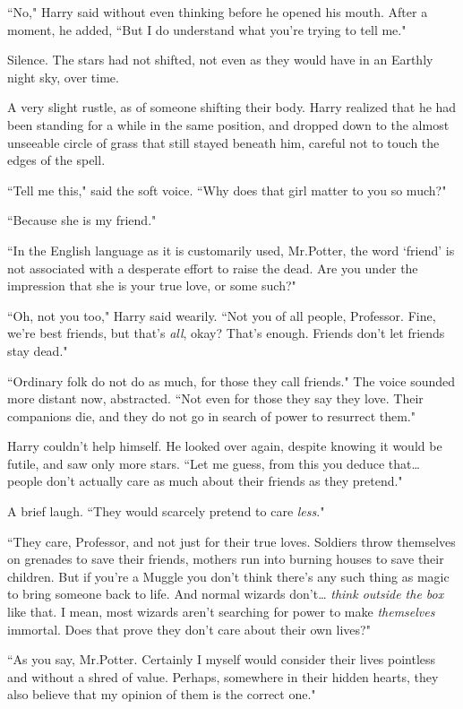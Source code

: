 ``No," Harry said without even thinking before he opened his mouth. After a moment, he added, ``But I do understand what you're trying to tell me."

Silence. The stars had not shifted, not even as they would have in an Earthly night sky, over time.

A very slight rustle, as of someone shifting their body. Harry realized that he had been standing for a while in the same position, and dropped down to the almost unseeable circle of grass that still stayed beneath him, careful not to touch the edges of the spell.

``Tell me this," said the soft voice. ``Why does that girl matter to you so much?"

``Because she is my friend."

``In the English language as it is customarily used, Mr.\?Potter, the word `friend' is not associated with a desperate effort to raise the dead. Are you under the impression that she is your true love, or some such?"

``Oh, not you too," Harry said wearily. ``Not you of all people, Professor. Fine, we're best friends, but that's \emph{all}, okay? That's enough. Friends don't let friends stay dead."

``Ordinary folk do not do as much, for those they call friends." The voice sounded more distant now, abstracted. ``Not even for those they say they love. Their companions die, and they do not go in search of power to resurrect them."

Harry couldn't help himself. He looked over again, despite knowing it would be futile, and saw only more stars. ``Let me guess, from this you deduce that{\ldots} people don't actually care as much about their friends as they pretend."

A brief laugh. ``They would scarcely pretend to care \emph{less}."

``They care, Professor, and not just for their true loves. Soldiers throw themselves on grenades to save their friends, mothers run into burning houses to save their children. But if you're a Muggle you don't think there's any such thing as magic to bring someone back to life. And normal wizards don't{\ldots} \emph{think outside the box} like that. I mean, most wizards aren't searching for power to make \emph{themselves} immortal. Does that prove they don't care about their own lives?"

``As you say, Mr.\?Potter. Certainly I myself would consider their lives pointless and without a shred of value. Perhaps, somewhere in their hidden hearts, they also believe that my opinion of them is the correct one."

